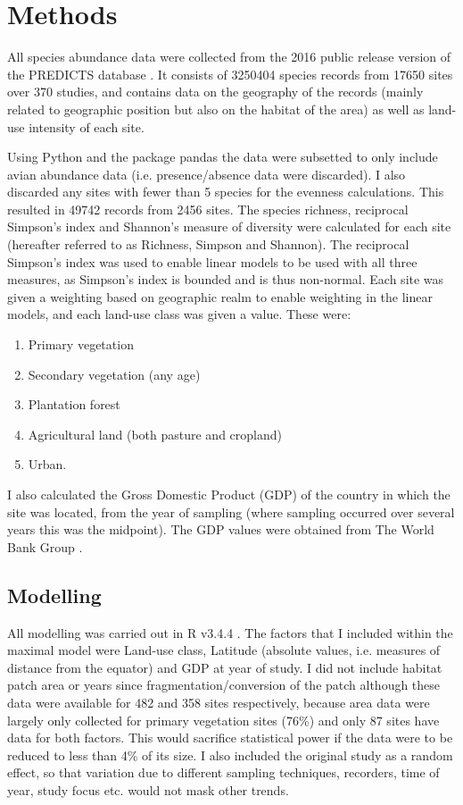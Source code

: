\documentclass[11pt]{article}
\begin{document}
\section{Methods}

All species abundance data were collected from the 2016 public release version of the PREDICTS database \parencite{Hudson2016}. It consists of 3250404 species records from 17650 sites over 370 studies, and contains data on the geography of the records (mainly related to geographic position but also on the habitat of the area) as well as land-use intensity of each site. 

Using Python \parencite{VanRossum2016} and the package pandas \parencite{McKinney2010} the data were subsetted to only include avian abundance data (i.e. presence/absence data were discarded). I also discarded any sites with fewer than 5 species for the evenness calculations. This resulted in 49742 records from 2456 sites. The species richness, reciprocal Simpson's index and Shannon's measure of diversity were calculated for each site (hereafter referred to as Richness, Simpson and Shannon). The reciprocal Simpson's index was used to enable linear models to be used with all three measures, as Simpson's index is bounded and is thus non-normal.
Each site was given a weighting based on geographic realm to enable weighting in the linear models, and each land-use class was given a value. These were:
\begin{enumerate}[noitemsep, topsep=0pt]
    \item Primary vegetation
    \item Secondary vegetation (any age)
    \item Plantation forest
    \item Agricultural land (both pasture and cropland)
    \item Urban.
\end{enumerate}
 I also calculated the Gross Domestic Product (GDP) of the country in which the site was located, from the year of sampling (where sampling occurred over several years this was the midpoint). The GDP values were obtained from The World Bank Group \parencite*{TheWorldBankGroup2018}. 

\subsection{Modelling}

All modelling was carried out in R v3.4.4 \parencite{CoreTeam2019}. The factors that I included within the maximal model were Land-use class, Latitude (absolute values, i.e. measures of distance from the equator) and GDP at year of study. I did not include habitat patch area or years since fragmentation/conversion of the patch although these data were available for 482 and 358 sites respectively, because area data were largely only collected for primary vegetation sites (76\%) and only 87 sites have data for both factors. This would sacrifice statistical power if the data were to be reduced to less than 4\% of its size. I also included the original study as a random effect, so that variation due to different sampling techniques, recorders, time of year, study focus etc. would not mask other trends.
\end{document}
